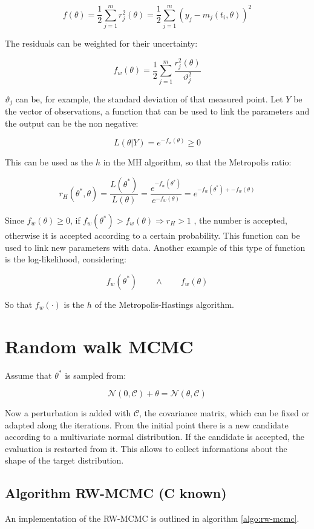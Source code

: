 $$f(\theta)=\frac{1}{2}\sum^m_{j=1}r^2_j(\theta)=\frac{1}{2}\sum^m_{j=1}(y_j-m_j(t_i,\theta))^2$$

The residuals can be weighted for their uncertainty:

$$f_w(\theta)=\frac{1}{2}\sum^m_{j=1} \frac{r^2_j(\theta)}{\vartheta_j^2}$$

$\vartheta_j$ can be, for example, the standard deviation of that measured point.
Let $Y$ be the vector of observations, a function that can be used to link the parameters and the output can be the non negative:

$$L(\theta|Y)=e^{-f_w(\theta)} \geq 0$$

This can be used as the $h$ in the MH algorithm, so that the Metropolis ratio:

$$r_H(\theta^*,\theta)=\frac{L(\theta^*)}{L(\theta)}=\frac{e^{-f_w(\theta^*)}}{e^{-f_w(\theta)}}=e^{-f_w(\theta^*)+-f_w(\theta)}$$

Since $f_w(\theta)\geq0$, if $f_w(\theta^*) > f_w(\theta) \Rightarrow r_H>1$ , the number is accepted, otherwise it is accepted according to a certain probability.
This function can be used to link new parameters with data.
Another example of this type of function is the log-likelihood, considering:

$$f_w(\theta^*)\qquad\land\qquad f_w(\theta)$$

So that $f_w(\cdot)$ is the $h$ of the Metropolis-Hastings algorithm.

\section{Random walk MCMC}
Assume that $\theta^*$ is sampled from:

$$\mathcal{N}(0,\mathcal{C})+\theta=\mathcal{N}(\theta,\mathcal{C})$$

Now a perturbation is added with $\mathcal{C}$, the covariance matrix, which can be fixed or adapted along the iterations.
From the initial point there is a new candidate according to a multivariate normal distribution.
If the candidate is accepted, the evaluation is restarted from it.
This allows to collect informations about the shape of the target distribution.


  \subsection{Algorithm RW-MCMC (C known)}
  An implementation of the RW-MCMC is outlined in algorithm \ref{algo:rw-mcmc}.

